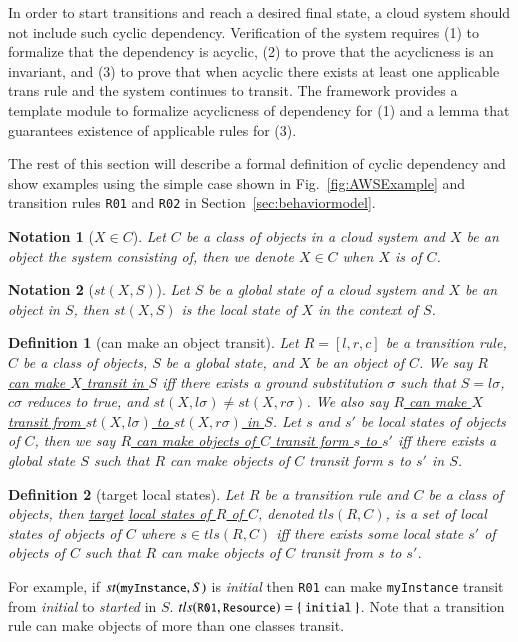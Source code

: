 \documentclass[12pt]{report}
\newtheorem{notation}{Notation}
\newtheorem{definition}{Definition}
\newcommand{\mbstt}[1]{\mbox{\small{\tt {#1}}}}
\newcommand{\stt}[1]{{\small{\tt {#1}}}}
\newcommand{\ul}{\underline}
\begin{document}
In order to start transitions and reach a desired final state, a cloud
system should not include such cyclic dependency. Verification of the
system requires (1) to formalize that the dependency is acyclic, (2)
to prove that the acyclicness is an invariant, and (3) to prove that
when acyclic there exists at least one applicable trans rule and the
system continues to transit. The framework provides a template module
to formalize acyclicness of dependency for (1) and a lemma that
guarantees existence of applicable rules for (3).

The rest of this section will describe a formal definition of cyclic
dependency and show examples using the simple case shown in
Fig.~\ref{fig:AWSExample} and transition rules {\tt R01} and {\tt R02}
in Section~\ref{sec:behaviormodel}.

\begin{notation}[$X \in C$]
Let $C$ be a class of objects in a cloud system and $X$ be an object
the system consisting of, then we denote \ul{$X \in C$} when $X$ is of
$C$.
\end{notation}

\begin{notation}[$st(X,S)$]
Let $S$ be a global state of a cloud system and $X$ be an object in
$S$, then \ul{$st(X,S)$} is the local state of $X$ in the context of
$S$.
\end{notation}

\begin{definition}[can make an object transit]
Let $R = [l,r,c]$ be a transition rule, $C$ be a class of objects, $S$
be a global state, and $X$ be an object of $C$. We say \ul{$R$ can
  make $X$ transit in $S$} iff there exists a ground substitution
$\sigma$ such that $S = l\sigma$, $c\sigma$ reduces to true, and
$st(X,l\sigma) \ne st(X,r\sigma)$. We also say \ul{$R$ can make $X$
  transit from $st(X,l\sigma)$ to $st(X,r\sigma)$ in $S$}.  Let $s$
and $s'$ be local states of objects of $C$, then we say \ul{$R$ can
  make objects of $C$ transit form $s$ to $s'$} iff there exists a
global state $S$ such that $R$ can make objects of $C$ transit form
$s$ to $s'$ in $S$.
\end{definition}

\begin{definition}[target local states]
Let $R$ be a transition rule and $C$ be a class of objects, then
\ul{target} \ul{local states of $R$ of $C$}, denoted \ul{$tls(R,C)$},
is a set of local states of objects of $C$ where $s \in tls(R,C)$ iff
there exists some local state $s'$ of objects of $C$ such that $R$ can
make objects of $C$ transit from $s$ to $s'$.
\end{definition}
For example, if $st(\mbstt{myInstance},S)$ is {\it initial} then
\stt{R01} can make \stt{myInstance} transit from {\it initial} to {\it
  started} in
$S$. $tls(\mbstt{R01},\mbstt{Resource})=\{~\mbstt{initial}~\}$. Note
that a transition rule can make objects of more than one classes transit.
\end{document}
